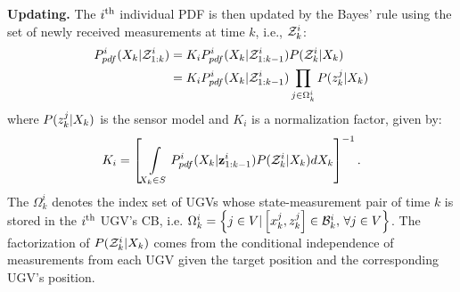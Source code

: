 	\textbf{Updating.}
	The $i^\text{th}$ individual PDF is then updated by the Bayes' rule using the set of newly received measurements at time $k$, i.e., $\mathcal{Z}^i_k$:
		\small\begin{align}\label{eqn:bayes_upd}
			\begin{split}
				P^i_{pdf}(X_k|\mathcal{Z}^i_{1:k})
				&= K_iP^i_{pdf}(X_k|\mathcal{Z}^i_{1:k-1})P(\mathcal{Z}^i_k|X_k)\\
				&=K_iP^i_{pdf}(X_k|\mathcal{Z}^i_{1:k-1})\prod\limits_{j\in\Omega^i_k}P(z^j_k|X_{k})
			\end{split}
		\end{align}\normalsize
	where $P(z^j_k|X_k)$ is the sensor model and $K_i$ is a normalization factor, given by:
	\small\begin{align*}
	K_i=\left[\int\limits_{X_k\in S} P^i_{pdf}(X_k|\mathbf{z}^i_{1:k-1})P(\mathcal{Z}^i_k|X_k)dX_k\right]^{-1}.
	\end{align*}\normalsize
	The $\Omega^i_k$ denotes the index set of UGVs whose state-measurement pair of time $k$ is stored in the $i^\text{th}$ UGV's CB, i.e. $\Omega^i_k=\left\lbrace j\in V | \left[x^j_k,z^j_k\right]\in \mathcal{B}^i_k,\, \forall j\in V\right\rbrace$.
	The factorization of $P(\mathcal{Z}^i_k|X_k)$ comes from the conditional independence of measurements from each UGV given the target position and the corresponding UGV's position.	
	
